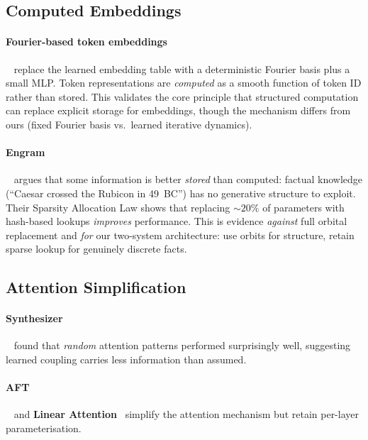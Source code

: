 \documentclass[11pt, a4paper]{article}
\theoremstyle{remark}
\begin{document}
\subsection{Computed Embeddings}

\paragraph{Fourier-based token embeddings}~\cite{fourier2025embeddings} replace the learned embedding table with a deterministic Fourier basis plus a small MLP.
Token representations are \emph{computed} as a smooth function of token ID rather than stored.
This validates the core principle that structured computation can replace explicit storage for embeddings, though the mechanism differs from ours (fixed Fourier basis vs.\ learned iterative dynamics).

\paragraph{Engram}~\cite{engram2026} argues that some information is better \emph{stored} than computed: factual knowledge (``Caesar crossed the Rubicon in 49~BC'') has no generative structure to exploit.
Their Sparsity Allocation Law shows that replacing ${\sim}20\%$ of parameters with hash-based lookups \emph{improves} performance.
This is evidence \emph{against} full orbital replacement and \emph{for} our two-system architecture: use orbits for structure, retain sparse lookup for genuinely discrete facts.

\subsection{Attention Simplification}

\paragraph{Synthesizer}~\cite{tay2021synthesizer} found that \emph{random} attention patterns performed surprisingly well, suggesting learned coupling carries less information than assumed.

\paragraph{AFT}~\cite{zhai2021attention} and \textbf{Linear Attention}~\cite{katharopoulos2020transformers} simplify the attention mechanism but retain per-layer parameterisation.
\end{document}
